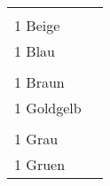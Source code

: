\documentclass{article}\usepackage[ngerman]{babel}\usepackage{geometry}\usepackage{lmodern}
\begin{document}
\begin{table}[p]
  \begin{tabular}{ll}    \hspace{-2em}    \fbox{\begin{minipage}[t][6cm][t]{8cm}
        \fontsize{45}{54} \selectfont
        \phantom{ }\\
      \phantom{ }1 Beige    \end{minipage}}
    &
\fbox{\begin{minipage}[t][6cm][t]{8cm}
        \fontsize{45}{54} \selectfont
        \phantom{ }\\
        \phantom{ } 1 Blau      \end{minipage}}\\    \hspace{-2em}    \fbox{\begin{minipage}[t][6cm][t]{8cm}
        \fontsize{45}{54} \selectfont
        \phantom{ }\\
      \phantom{ }1 Braun    \end{minipage}}
    &
\fbox{\begin{minipage}[t][6cm][t]{8cm}
        \fontsize{45}{54} \selectfont
        \phantom{ }\\
        \phantom{ } 1 Goldgelb      \end{minipage}}\\    \hspace{-2em}    \fbox{\begin{minipage}[t][6cm][t]{8cm}
        \fontsize{45}{54} \selectfont
        \phantom{ }\\
      \phantom{ }1 Grau    \end{minipage}}
    &
\fbox{\begin{minipage}[t][6cm][t]{8cm}
        \fontsize{45}{54} \selectfont
        \phantom{ }\\
        \phantom{ } 1 Gruen      \end{minipage}}\\\end{tabular}
\end{table}
\end{document}
